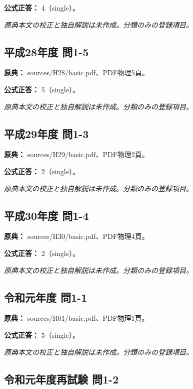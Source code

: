 \textbf{公式正答：} 4（single）。

\par\textit{原典本文の校正と独自解説は未作成。分類のみの登録項目。}

\subsection{平成28年度 問1-5}
\label{q:h28-reg-basic-1-5}

\noindent\textbf{原典：} sources/H28/basic.pdf、PDF物理5頁。

\textbf{公式正答：} 5（single）。

\par\textit{原典本文の校正と独自解説は未作成。分類のみの登録項目。}

\subsection{平成29年度 問1-3}
\label{q:h29-reg-basic-1-3}

\noindent\textbf{原典：} sources/H29/basic.pdf、PDF物理2頁。

\textbf{公式正答：} 2（single）。

\par\textit{原典本文の校正と独自解説は未作成。分類のみの登録項目。}

\subsection{平成30年度 問1-4}
\label{q:h30-reg-basic-1-4}

\noindent\textbf{原典：} sources/H30/basic.pdf、PDF物理4頁。

\textbf{公式正答：} 2（single）。

\par\textit{原典本文の校正と独自解説は未作成。分類のみの登録項目。}

\subsection{令和元年度 問1-1}
\label{q:r01-reg-basic-1-1}

\noindent\textbf{原典：} sources/R01/basic.pdf、PDF物理1頁。

\textbf{公式正答：} 5（single）。

\par\textit{原典本文の校正と独自解説は未作成。分類のみの登録項目。}

\subsection{令和元年度再試験 問1-2}
\label{q:r01-ret-basic-1-2}

